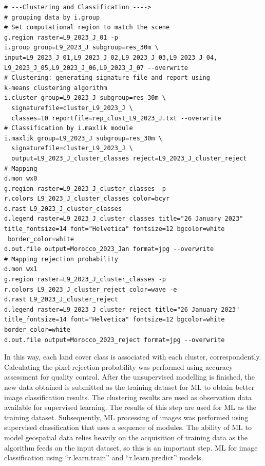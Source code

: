 \documentclass[geomatics,article,submit,pdftex,moreauthors]{Definitions/mdpi}
\begin{document}
\begin{footnotesize}
\begin{verbatim}
# ---Clustering and Classification ---->
# grouping data by i.group
# Set computational region to match the scene
g.region raster=L9_2023_J_01 -p
i.group group=L9_2023_J subgroup=res_30m \
input=L9_2023_J_01,L9_2023_J_02,L9_2023_J_03,L9_2023_J_04,
L9_2023_J_05,L9_2023_J_06,L9_2023_J_07 --overwrite
# Clustering: generating signature file and report using 
k-means clustering algorithm
i.cluster group=L9_2023_J subgroup=res_30m \
  signaturefile=cluster_L9_2023_J \
  classes=10 reportfile=rep_clust_L9_2023_J.txt --overwrite
# Classification by i.maxlik module
i.maxlik group=L9_2023_J subgroup=res_30m \
  signaturefile=cluster_L9_2023_J \
  output=L9_2023_J_cluster_classes reject=L9_2023_J_cluster_reject 
# Mapping
d.mon wx0
g.region raster=L9_2023_J_cluster_classes -p
r.colors L9_2023_J_cluster_classes color=bcyr
d.rast L9_2023_J_cluster_classes
d.legend raster=L9_2023_J_cluster_classes title="26 January 2023" 
title_fontsize=14 font="Helvetica" fontsize=12 bgcolor=white
 border_color=white
d.out.file output=Morocco_2023_Jan format=jpg --overwrite
# Mapping rejection probability
d.mon wx1
g.region raster=L9_2023_J_cluster_classes -p
r.colors L9_2023_J_cluster_reject color=wave -e
d.rast L9_2023_J_cluster_reject
d.legend raster=L9_2023_J_cluster_reject title="26 January 2023" 
title_fontsize=14 font="Helvetica" fontsize=12 bgcolor=white 
border_color=white
d.out.file output=Morocco_2023_reject format=jpg --overwrite
\end{verbatim}
\end{footnotesize}

In this way, each land cover class is associated with each cluster, correspondently. Calculating the pixel rejection probability was performed using accuracy assessment for quality control. After the unsupervised modelling is finished, the new data obtained is submitted as the training dataset for ML to obtain better image classification results. The clustering results are used as observation data available for supervised learning. The results of this step are used for ML as the training dataset. Subsequently, ML processing of images was performed using supervised classification that uses a sequence of modules. The ability of ML to model geospatial data relies heavily on the acquisition of training data as the algorithm feeds on the input dataset, so this is an important step. ML for image classification using “r.learn.train” and “r.learn.predict” models.
\end{document}
